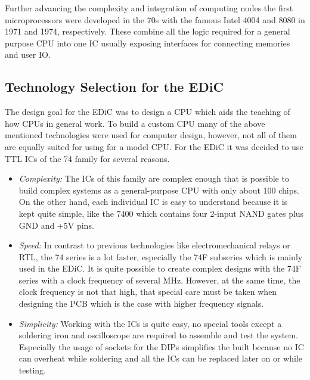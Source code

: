 Further advancing the complexity and integration of computing nodes the first microprocessors were developed in the 70s with the famous Intel 4004 and 8080 in 1971 and 1974, respectively.
These combine all the logic required for a general purpose \gls{CPU} into one \gls{IC} usually exposing interfaces for connecting memories and user \gls{IO}.

\subsection{Technology Selection for the \gls{EDiC}}
The design goal for the \gls{EDiC} was to design a \gls{CPU} which aids the teaching of how \glspl{CPU} in general work.
To build a custom \gls{CPU} many of the above mentioned technologies were used for computer design, however, not all of them are equally suited for using for a model \gls{CPU}.
For the \gls{EDiC} it was decided to use \gls{TTL} \glspl{IC} of the 74 family for several reasons.
\begin{itemize}
  \item \emph{Complexity:} The \glspl{IC} of this family are complex enough that is possible to build complex systems as a general-purpose \gls{CPU} with only about 100 chips.
  On the other hand, each individual \gls{IC} is easy to understand because it is kept quite simple, like the 7400 which contains four 2-input NAND gates plus GND and +5V pins.

  \item \emph{Speed:} In contrast to previous technologies like electromechanical relays or \gls{RTL}, the 74 series is a lot faster, especially the 74F subseries which is mainly used in the \gls{EDiC}.
  It is quite possible to create complex designs with the 74F series with a clock frequency of several \unit{\mega\hertz}.
  However, at the same time, the clock frequency is not that high, that special care must be taken when designing the \gls{PCB} which is the case with higher frequency signals.

  \item \emph{Simplicity:} Working with the \glspl{IC} is quite easy, no special tools except a soldering iron and oscilloscope are required to assemble and test the system.
  Especially the usage of sockets for the \glspl{DIP} simplifies the built because no \gls{IC} can overheat while soldering and all the \glspl{IC} can be replaced later on or while testing.
\end{itemize}

